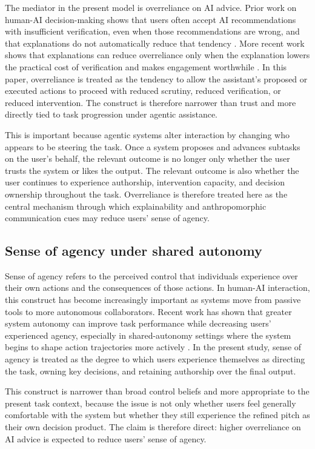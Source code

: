 \documentclass[sigconf,review,anonymous]{acmart}
\begin{document}
The mediator in the present model is overreliance on AI advice. Prior work on human-AI decision-making shows that users often accept AI recommendations with insufficient verification, even when those recommendations are wrong, and that explanations do not automatically reduce that tendency \cite{bucinca2021trust}. More recent work shows that explanations can reduce overreliance only when the explanation lowers the practical cost of verification and makes engagement worthwhile \cite{vasconcelos2023explanations}. In this paper, overreliance is treated as the tendency to allow the assistant’s proposed or executed actions to proceed with reduced scrutiny, reduced verification, or reduced intervention. The construct is therefore narrower than trust and more directly tied to task progression under agentic assistance.

This is important because agentic systems alter interaction by changing who appears to be steering the task. Once a system proposes and advances subtasks on the user’s behalf, the relevant outcome is no longer only whether the user trusts the system or likes the output. The relevant outcome is also whether the user continues to experience authorship, intervention capacity, and decision ownership throughout the task. Overreliance is therefore treated here as the central mechanism through which explainability and anthropomorphic communication cues may reduce users’ sense of agency.

\subsection{Sense of agency under shared autonomy}

Sense of agency refers to the perceived control that individuals experience over their own actions and the consequences of those actions. In human-AI interaction, this construct has become increasingly important as systems move from passive tools to more autonomous collaborators. Recent work has shown that greater system autonomy can improve task performance while decreasing users’ experienced agency, especially in shared-autonomy settings where the system begins to shape action trajectories more actively \cite{legaspi2024sense,collier2025sense}. In the present study, sense of agency is treated as the degree to which users experience themselves as directing the task, owning key decisions, and retaining authorship over the final output.

This construct is narrower than broad control beliefs and more appropriate to the present task context, because the issue is not only whether users feel generally comfortable with the system but whether they still experience the refined pitch as their own decision product. The claim is therefore direct: higher overreliance on AI advice is expected to reduce users’ sense of agency.
\end{document}
